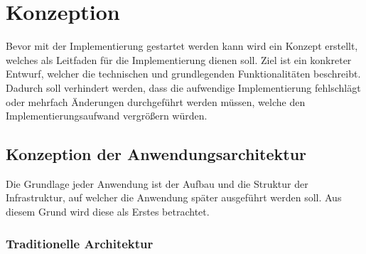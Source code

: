 \chapter{Konzeption}
Bevor mit der Implementierung gestartet werden kann wird ein Konzept erstellt, welches als Leitfaden für die Implementierung dienen soll.
Ziel ist ein konkreter Entwurf, welcher die technischen und grundlegenden Funktionalitäten beschreibt.
Dadurch soll verhindert werden, dass die aufwendige Implementierung fehlschlägt oder mehrfach Änderungen durchgeführt werden müssen, welche den Implementierungsaufwand vergrößern würden.


















\section{Konzeption der Anwendungsarchitektur}
Die Grundlage jeder Anwendung ist der Aufbau und die Struktur der Infrastruktur, auf welcher die Anwendung später ausgeführt werden soll.
Aus diesem Grund wird diese als Erstes betrachtet.

\subsection{Traditionelle Architektur}

